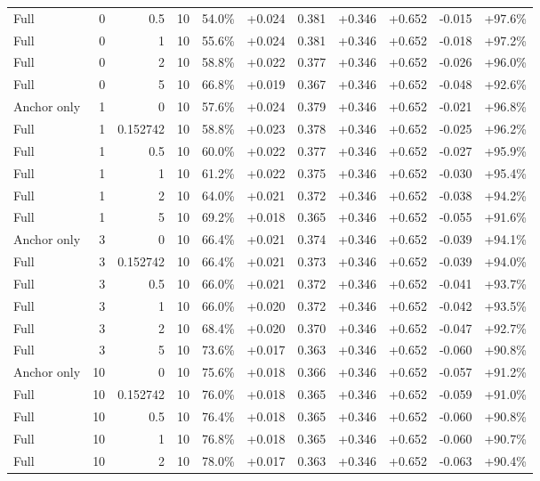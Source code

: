 \begin{table}[htbp]
\begin{tabular}{lrrrccccccc}
Full & 0 & 0.5 & 10 & 54.0\% & +0.024 & 0.381 & +0.346 & +0.652 & -0.015 & +97.6\% \\
Full & 0 & 1 & 10 & 55.6\% & +0.024 & 0.381 & +0.346 & +0.652 & -0.018 & +97.2\% \\
Full & 0 & 2 & 10 & 58.8\% & +0.022 & 0.377 & +0.346 & +0.652 & -0.026 & +96.0\% \\
Full & 0 & 5 & 10 & 66.8\% & +0.019 & 0.367 & +0.346 & +0.652 & -0.048 & +92.6\% \\
Anchor only & 1 & 0 & 10 & 57.6\% & +0.024 & 0.379 & +0.346 & +0.652 & -0.021 & +96.8\% \\
Full & 1 & 0.152742 & 10 & 58.8\% & +0.023 & 0.378 & +0.346 & +0.652 & -0.025 & +96.2\% \\
Full & 1 & 0.5 & 10 & 60.0\% & +0.022 & 0.377 & +0.346 & +0.652 & -0.027 & +95.9\% \\
Full & 1 & 1 & 10 & 61.2\% & +0.022 & 0.375 & +0.346 & +0.652 & -0.030 & +95.4\% \\
Full & 1 & 2 & 10 & 64.0\% & +0.021 & 0.372 & +0.346 & +0.652 & -0.038 & +94.2\% \\
Full & 1 & 5 & 10 & 69.2\% & +0.018 & 0.365 & +0.346 & +0.652 & -0.055 & +91.6\% \\
Anchor only & 3 & 0 & 10 & 66.4\% & +0.021 & 0.374 & +0.346 & +0.652 & -0.039 & +94.1\% \\
Full & 3 & 0.152742 & 10 & 66.4\% & +0.021 & 0.373 & +0.346 & +0.652 & -0.039 & +94.0\% \\
Full & 3 & 0.5 & 10 & 66.0\% & +0.021 & 0.372 & +0.346 & +0.652 & -0.041 & +93.7\% \\
Full & 3 & 1 & 10 & 66.0\% & +0.020 & 0.372 & +0.346 & +0.652 & -0.042 & +93.5\% \\
Full & 3 & 2 & 10 & 68.4\% & +0.020 & 0.370 & +0.346 & +0.652 & -0.047 & +92.7\% \\
Full & 3 & 5 & 10 & 73.6\% & +0.017 & 0.363 & +0.346 & +0.652 & -0.060 & +90.8\% \\
Anchor only & 10 & 0 & 10 & 75.6\% & +0.018 & 0.366 & +0.346 & +0.652 & -0.057 & +91.2\% \\
Full & 10 & 0.152742 & 10 & 76.0\% & +0.018 & 0.365 & +0.346 & +0.652 & -0.059 & +91.0\% \\
Full & 10 & 0.5 & 10 & 76.4\% & +0.018 & 0.365 & +0.346 & +0.652 & -0.060 & +90.8\% \\
Full & 10 & 1 & 10 & 76.8\% & +0.018 & 0.365 & +0.346 & +0.652 & -0.060 & +90.7\% \\
Full & 10 & 2 & 10 & 78.0\% & +0.017 & 0.363 & +0.346 & +0.652 & -0.063 & +90.4\% \\

\end{tabular}
\end{table}

